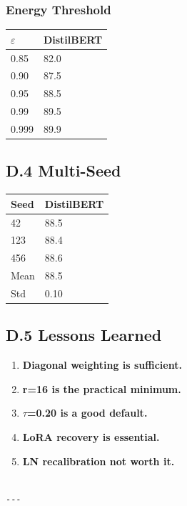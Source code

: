 \subsubsection{Energy Threshold}

\begin{table}[H]
\centering
\small
\begin{tabular}{ll}
\toprule
\textbf{$\varepsilon$} & \textbf{DistilBERT} \\
\midrule
0.85 & 82.0 \\
0.90 & 87.5 \\
0.95 & 88.5 \\
0.99 & 89.5 \\
0.999 & 89.9 \\
\bottomrule
\end{tabular}
\end{table}

\subsection{D.4 Multi-Seed}

\begin{table}[H]
\centering
\small
\begin{tabular}{ll}
\toprule
\textbf{Seed} & \textbf{DistilBERT} \\
\midrule
42 & 88.5 \\
123 & 88.4 \\
456 & 88.6 \\
Mean & 88.5 \\
Std & 0.10 \\
\bottomrule
\end{tabular}
\end{table}

\subsection{D.5 Lessons Learned}

\begin{enumerate}
\item \textbf{Diagonal weighting is sufficient.}
\item \textbf{r=16 is the practical minimum.}
\item \textbf{$\tau$=0.20 is a good default.}
\item \textbf{LoRA recovery is essential.}
\item \textbf{LN recalibration not worth it.}
\end{enumerate}
\begin{lstlisting}

---
\end{lstlisting}